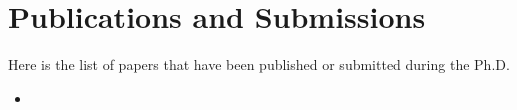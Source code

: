 \chapter{Publications and Submissions}\label{app:publications}
Here is the list of papers that have been published or submitted during the Ph.D.

\begin{itemize}
	\item 
\end{itemize}


